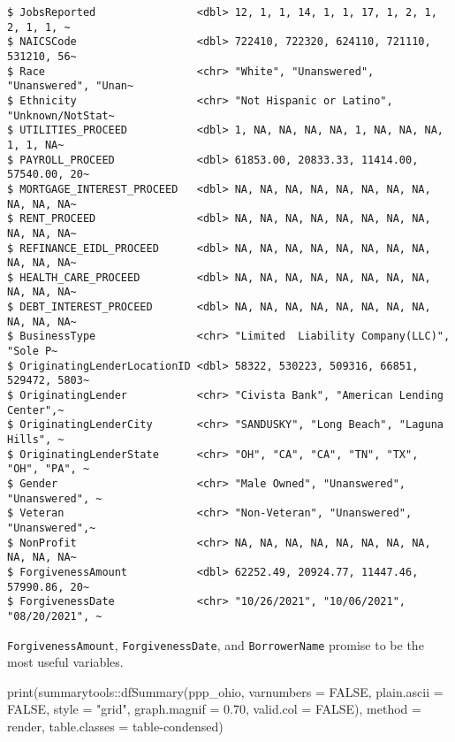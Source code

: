 \documentclass[
  letterpaper,
  DIV=11,
  numbers=noendperiod]{scrartcl}
\newenvironment{Shaded}{\begin{snugshade}}{\end{snugshade}}
\newcommand{\AttributeTok}[1]{\textcolor[rgb]{0.40,0.45,0.13}{#1}}
\newcommand{\ConstantTok}[1]{\textcolor[rgb]{0.56,0.35,0.01}{#1}}
\newcommand{\FloatTok}[1]{\textcolor[rgb]{0.68,0.00,0.00}{#1}}
\newcommand{\FunctionTok}[1]{\textcolor[rgb]{0.28,0.35,0.67}{#1}}
\newcommand{\NormalTok}[1]{\textcolor[rgb]{0.00,0.23,0.31}{#1}}
\newcommand{\SpecialCharTok}[1]{\textcolor[rgb]{0.37,0.37,0.37}{#1}}
\newcommand{\StringTok}[1]{\textcolor[rgb]{0.13,0.47,0.30}{#1}}
\begin{document}
\begin{verbatim}
$ JobsReported                <dbl> 12, 1, 1, 14, 1, 1, 17, 1, 2, 1, 2, 1, 1, ~
$ NAICSCode                   <dbl> 722410, 722320, 624110, 721110, 531210, 56~
$ Race                        <chr> "White", "Unanswered", "Unanswered", "Unan~
$ Ethnicity                   <chr> "Not Hispanic or Latino", "Unknown/NotStat~
$ UTILITIES_PROCEED           <dbl> 1, NA, NA, NA, NA, 1, NA, NA, NA, 1, 1, NA~
$ PAYROLL_PROCEED             <dbl> 61853.00, 20833.33, 11414.00, 57540.00, 20~
$ MORTGAGE_INTEREST_PROCEED   <dbl> NA, NA, NA, NA, NA, NA, NA, NA, NA, NA, NA~
$ RENT_PROCEED                <dbl> NA, NA, NA, NA, NA, NA, NA, NA, NA, NA, NA~
$ REFINANCE_EIDL_PROCEED      <dbl> NA, NA, NA, NA, NA, NA, NA, NA, NA, NA, NA~
$ HEALTH_CARE_PROCEED         <dbl> NA, NA, NA, NA, NA, NA, NA, NA, NA, NA, NA~
$ DEBT_INTEREST_PROCEED       <dbl> NA, NA, NA, NA, NA, NA, NA, NA, NA, NA, NA~
$ BusinessType                <chr> "Limited  Liability Company(LLC)", "Sole P~
$ OriginatingLenderLocationID <dbl> 58322, 530223, 509316, 66851, 529472, 5803~
$ OriginatingLender           <chr> "Civista Bank", "American Lending Center",~
$ OriginatingLenderCity       <chr> "SANDUSKY", "Long Beach", "Laguna Hills", ~
$ OriginatingLenderState      <chr> "OH", "CA", "CA", "TN", "TX", "OH", "PA", ~
$ Gender                      <chr> "Male Owned", "Unanswered", "Unanswered", ~
$ Veteran                     <chr> "Non-Veteran", "Unanswered", "Unanswered",~
$ NonProfit                   <chr> NA, NA, NA, NA, NA, NA, NA, NA, NA, NA, NA~
$ ForgivenessAmount           <dbl> 62252.49, 20924.77, 11447.46, 57990.86, 20~
$ ForgivenessDate             <chr> "10/26/2021", "10/06/2021", "08/20/2021", ~
\end{verbatim}

\texttt{ForgivenessAmount}, \texttt{ForgivenessDate}, and
\texttt{BorrowerName} promise to be the most useful variables.

\begin{Shaded}
\begin{Highlighting}[]
\FunctionTok{print}\NormalTok{(summarytools}\SpecialCharTok{::}\FunctionTok{dfSummary}\NormalTok{(ppp\_ohio,}
                        \AttributeTok{varnumbers =} \ConstantTok{FALSE}\NormalTok{,}
                        \AttributeTok{plain.ascii  =} \ConstantTok{FALSE}\NormalTok{, }
                        \AttributeTok{style        =} \StringTok{"grid"}\NormalTok{, }
                        \AttributeTok{graph.magnif =} \FloatTok{0.70}\NormalTok{, }
                        \AttributeTok{valid.col    =} \ConstantTok{FALSE}\NormalTok{),}
      \AttributeTok{method =} \StringTok{\textquotesingle{}render\textquotesingle{}}\NormalTok{,}
      \AttributeTok{table.classes =} \StringTok{\textquotesingle{}table{-}condensed\textquotesingle{}}\NormalTok{)}
\end{Highlighting}
\end{Shaded}
\end{document}
